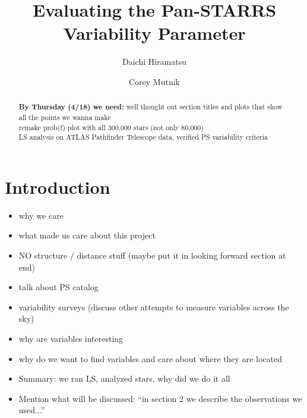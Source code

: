 \documentclass[aps,prb,twocolumn,superscriptaddress]{revtex4-1}
\begin{document}
\title{Evaluating the Pan-STARRS Variability Parameter}


%


\author{Daichi Hiramatsu}
\author{Corey Mutnik}



\begin{abstract}
\textbf{By Thursday (4/18) we need:} well thought out section titles and plots that show all the points we wanna make\\

remake prob(f) plot with all 300,000 stars (not only 80,000)\\

LS analysis on ATLAS Pathfinder Telescope data, verified PS variability criteria
\end{abstract}

\maketitle    




\section{Introduction}
\begin{itemize}
	\item{} why we care
	\item{} what made us care about this project
	\item{} NO structure $/$ distance stuff (maybe put it in looking forward section at end)
	\item{} talk about PS catalog
	\item{} variability surveys (discuss other attempts to measure variables across the sky)
	\item{} why are variables interesting
	\item{} why do we want to find variables and care about where they are located
	\item{} Summary: we ran LS, analyzed stars, why did we do it all
	\item{} Mention what will be discussed: ``in section 2 we describe the observations we used...''
\end{itemize}
\end{document}
